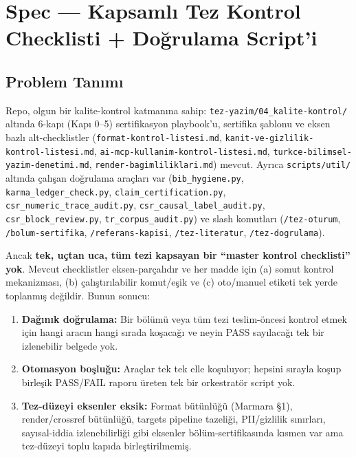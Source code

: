 \documentclass[
  turkish,
  12pt,
  a4paper,
]{report}
\author{}
\date{}
\providecommand{\tightlist}{%
  \setlength{\itemsep}{0pt}\setlength{\parskip}{0pt}}
\renewcommand*\contentsname{İçindekiler}
\newcommand\contentsname{İçindekiler}
\renewcommand*\listfigurename{Şekil Listesi}
\newcommand\listfigurename{Şekil Listesi}
\renewcommand*\listtablename{Tablo Listesi}
\newcommand\listtablename{Tablo Listesi}
\begin{document}
\renewcommand{\listfigurename}{ŞEKİLLER DİZİNİ}
\renewcommand{\listtablename}{TABLOLAR DİZİNİ}

\renewcommand*\contentsname{İÇİNDEKİLER}
{
\hypersetup{linkcolor=black}
\setcounter{tocdepth}{2}
\tableofcontents
}
\listoffigures
\listoftables

\chapter{Spec --- Kapsamlı Tez Kontrol Checklisti + Doğrulama
Script'i}\label{spec-kapsamlux131-tez-kontrol-checklisti-doux11frulama-scripti}

\section{Problem Tanımı}\label{problem-tanux131mux131}

Repo, olgun bir kalite-kontrol katmanına sahip:
\texttt{tez-yazim/04\_kalite-kontrol/} altında 6-kapı (Kapı 0--5)
sertifikasyon playbook'u, sertifika şablonu ve eksen bazlı
alt-checklistler (\texttt{format-kontrol-listesi.md},
\texttt{kanit-ve-gizlilik-kontrol-listesi.md},
\texttt{ai-mcp-kullanim-kontrol-listesi.md},
\texttt{turkce-bilimsel-yazim-denetimi.md},
\texttt{render-bagimliliklari.md}) mevcut. Ayrıca \texttt{scripts/util/}
altında çalışan doğrulama araçları var (\texttt{bib\_hygiene.py},
\texttt{karma\_ledger\_check.py}, \texttt{claim\_certification.py},
\texttt{csr\_numeric\_trace\_audit.py},
\texttt{csr\_causal\_label\_audit.py}, \texttt{csr\_block\_review.py},
\texttt{tr\_corpus\_audit.py}) ve slash komutları (\texttt{/tez-oturum},
\texttt{/bolum-sertifika}, \texttt{/referans-kapisi},
\texttt{/tez-literatur}, \texttt{/tez-dogrulama}).

Ancak \textbf{tek, uçtan uca, tüm tezi kapsayan bir ``master kontrol
checklisti'' yok}. Mevcut checklistler eksen-parçalıdır ve her madde
için (a) somut kontrol mekanizması, (b) çalıştırılabilir komut/eşik ve
(c) oto/manuel etiketi tek yerde toplanmış değildir. Bunun sonucu:

\begin{enumerate}
\def\labelenumi{\arabic{enumi}.}
\tightlist
\item
  \textbf{Dağınık doğrulama:} Bir bölümü veya tüm tezi teslim-öncesi
  kontrol etmek için hangi aracın hangi sırada koşacağı ve neyin PASS
  sayılacağı tek bir izlenebilir belgede yok.
\item
  \textbf{Otomasyon boşluğu:} Araçlar tek tek elle koşuluyor; hepsini
  sırayla koşup birleşik PASS/FAIL raporu üreten tek bir orkestratör
  script yok.
\item
  \textbf{Tez-düzeyi eksenler eksik:} Format bütünlüğü (Marmara §1),
  render/crossref bütünlüğü, targets pipeline tazeliği, PII/gizlilik
  sınırları, sayısal-iddia izlenebilirliği gibi eksenler
  bölüm-sertifikasında kısmen var ama tez-düzeyi toplu kapıda
  birleştirilmemiş.
\end{enumerate}
\end{document}
